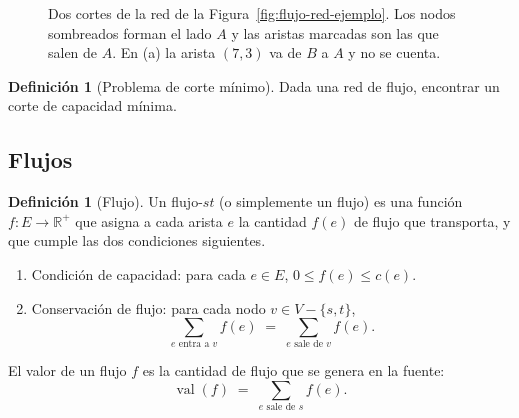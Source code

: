 \documentclass[12pt, spanish, oneside, openany]{book}
\newcommand{\RedOcho}[1]{%
  \foreach \n/\x/\y/\lab in {s/0/0/s, n2/2.0/1.5/2, n3/2.0/0/3, n4/2.0/-1.5/4,
      n5/4.6/1.5/5, n6/4.6/0/6, n7/4.6/-1.5/7, t/6.6/0/t}
    \node[nF, n-\n/.try] (\n) at (\x,\y) {$\lab$};
  \foreach \a/\b/\l in #1
    \draw[nf, rb/.try, e-\a-\b/.try] (\a) --
      node[ec, rl/.try, p-\a-\b, l-\a-\b/.try] {$\l$} (\b);
}
\newcommand{\CapOcho}{s/n2/10, s/n3/5, s/n4/15, n2/n5/9, n2/n3/4, n2/n6/15,
  n5/n6/15, n5/t/10, n3/n6/8, n3/n4/4, n7/n3/6, n6/t/10, n6/n7/15, n4/n7/16,
  n7/t/10}
\theoremstyle{uprightplain}
\theoremstyle{definition}
\newtheorem{definicion}[teorema]{Definición}
\theoremstyle{remark}
\theoremstyle{definition}
\newcommand{\val}{\operatorname{val}}   %
\begin{document}
\begin{figure}[H]
\centering
{}
\caption{Dos cortes de la red de la Figura~\ref{fig:flujo-red-ejemplo}. Los
nodos sombreados forman el lado $A$ y las aristas marcadas son las que salen de
$A$. En (a) la arista $(7,3)$ va de $B$ a $A$ y no se cuenta. }
\label{fig:flujo-cortes}
\end{figure}

\begin{definicion}[Problema de corte mínimo]
\label{def:problema-corte-minimo}
Dada una red de flujo, encontrar un corte de capacidad mínima.
\end{definicion}

\subsection{Flujos}

\begin{definicion}[Flujo]
\label{def:flujo}
Un flujo-$st$ (o simplemente un flujo) es una función $f:E\to\mathbb{R}^{+}$ que asigna a cada arista $e$ la cantidad $f(e)$ de flujo que transporta, y que cumple las dos condiciones siguientes.
\begin{enumerate}[label=(\roman*)]
    \item Condición de capacidad: para cada $e\in E$, $0\le f(e)\le c(e)$.
    \item Conservación de flujo: para cada nodo $v\in V-\{s,t\}$,
    \[
    \sum_{e\text{ entra a }v} f(e) \;=\; \sum_{e\text{ sale de }v} f(e).
    \]
\end{enumerate}
El valor de un flujo $f$ es la cantidad de flujo que se genera en la fuente:
\[
\val(f)\;=\;\sum_{e\text{ sale de }s} f(e).
\]
\end{definicion}
\end{document}
